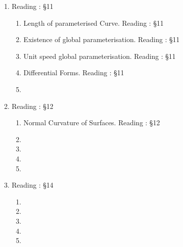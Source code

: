 \begin{enumerate}[label=Week \arabic*]
\begin{enumerate}[label=Day \arabic*]
		\item Weingarten map. Reading : \S9
		\item Properties of Weingarten Map. Reading : \S9
		\item Curvature of Plan Curves. Reading : \S10
		\item
	\end{enumerate}
	\item Reading : \S11
	\begin{enumerate}[label=Day \arabic*]
		\item Length of parameterised Curve. Reading : \S11
		\item Existence of global parameterisation. Reading : \S11
		\item Unit speed global parameterisation. Reading : \S11
		\item Differential Forms. Reading : \S11
		\item
	\end{enumerate}
	\item Reading : \S12
	\begin{enumerate}[label=Day \arabic*]
		\item Normal Curvature of Surfaces. Reading : \S12
		\item 
		\item
		\item 
		\item
	\end{enumerate}
	\item Reading : \S14
	\begin{enumerate}[label=Day \arabic*]
		\item 
		\item 
		\item
		\item 
		\item
	\end{enumerate}
\end{enumerate}
